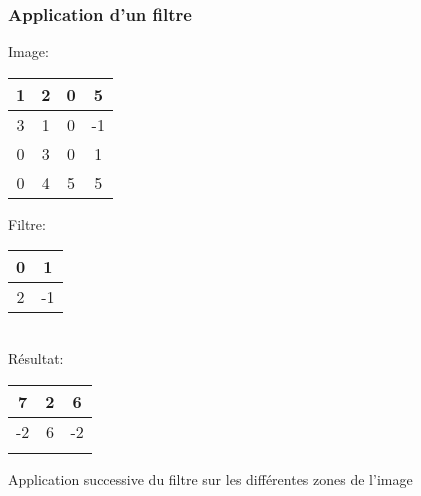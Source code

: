 \documentclass{formation}
\begin{document}
\begin{frame}
  \frametitle{Application d'un filtre}
  \begin{multicols}{2}
    Image:
    \begin{tabular}{|c|c|c|c|}
      \hline
      1 & 2 & 0 & 5 \\
      \hline
      3 & 1 & \cellcolor{green}0 & \cellcolor{green}-1 \\
      \hline
      0 & 3 & \cellcolor{green}0 & \cellcolor{green}1 \\
      \hline
      0 & 4 & 5 & 5 \\
      \hline
    \end{tabular}

    \columnbreak

    Filtre:
    \begin{tabular}{|c|c|}
      \hline
      0 & 1  \\
      \hline
      2 & -1 \\
      \hline
    \end{tabular}\\[.5cm]
    Résultat:
    \begin{tabular}{|c|c|c|}
      \hline
      7 & 2 & 6\\
      \hline
      -2 & 6 & -2\\
      \hline
        &  & \\
      \hline
    \end{tabular}
  \end{multicols}
  Application successive du filtre sur les différentes zones de l'image
\end{frame}
\end{document}
